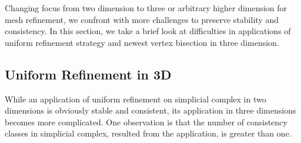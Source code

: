 Changing focus from two dimension to three or arbitrary higher dimension for mesh refinement, we confront with more challenges to preserve stability and consistency. In this section, we take a brief look at difficulties in applications of uniform refinement strategy and newest vertex bisection in three dimension.

\subsection{Uniform Refinement in 3D}
While an application of uniform refinement on simplicial complex in two dimensions is obviously stable and consistent, its application in three dimensions becomes more complicated. One observation is that the number of consistency classes in simplicial complex, resulted from the application, is greater than one.

